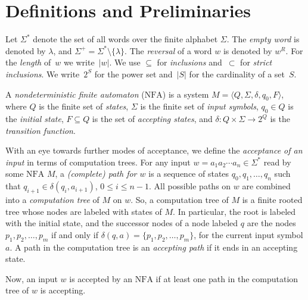 \documentclass[final,copyright,noderivs]{eptcs}
\theoremstyle{plain}
\theoremstyle{definition}
\newcommand{\nfa}{\textrm{NFA}}
\begin{document}
\section{Definitions and Preliminaries}\label{sect:prelim}

Let $\Sigma^*$ denote the set of all words over the finite alphabet $\Sigma$.
The \emph{empty word} is denoted by $\lambda$, and
$\Sigma^+ = \Sigma^* \setminus \{\lambda\}$. 
The \emph{reversal} of a word $w$ is denoted by $w^R$.  For the \emph{length} of~$w$ we
write~$|w|$. 
We use $\subseteq$ for \emph{inclusions} and~$\subset$ for \emph{strict inclusions}.
We write~$2^{S}$ for the power set and~$|S|$ for the cardinality of a
set~$S$. 

A \emph{nondeterministic finite automaton} ($\nfa$) is a
system $M=\langle Q,\Sigma,\delta,q_0,F\rangle$, where 
$Q$ is the finite set of \emph{states},
$\Sigma$ is the finite set of \emph{input symbols},
$q_0 \in Q$ is the \emph{initial state},
$F\subseteq Q$ is the set of \emph{accepting states}, and
$\delta\colon Q \times\Sigma\to 2^{Q}$ is the \emph{transition function}.  

With an eye towards further modes of acceptance, 
we define the \emph{acceptance of an input} in terms of computation trees. 
For any input $w=a_1a_2\cdots a_n\in\Sigma^*$ read by some $\nfa$ $M$, a
\emph{(complete) path for $w$} is a sequence of states $q_0,q_1,\dots,q_{n}$ such that
$q_{i+1}\in\delta(q_i,a_{i+1})$, $0\leq i\leq n-1$.
All possible paths on $w$ are combined into a \emph{computation tree} of
$M$ on $w$. So, a computation tree of $M$ is a finite rooted tree
whose nodes are labeled with states of $M$. In particular, the root is labeled
with the initial state, and the successor nodes of a node labeled $q$ are
the nodes $p_1,p_2,\dots, p_m$ if and only if $\delta(q,a)=\{p_1,p_2,\dots,
p_m\}$, for the current input symbol $a$.
A path in the computation tree is an
\emph{accepting path} if it ends in an accepting state.

Now, an input $w$ is accepted by an $\nfa$ 
if at least one path in the computation tree of $w$ is accepting.
\end{document}
